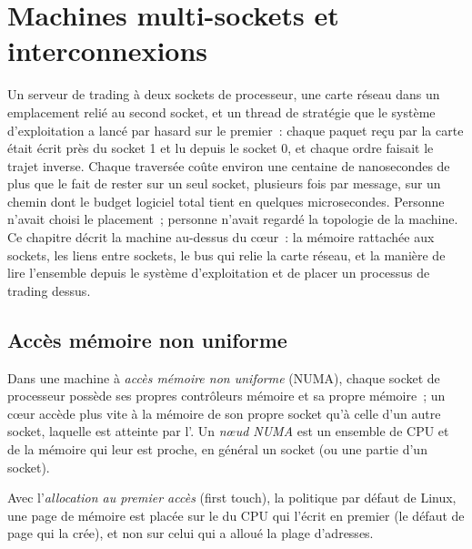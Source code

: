 \chapter{Machines multi-sockets et interconnexions}\label{ch:ll:multi-socket-machines-and-interconnects}

Un serveur de trading à deux sockets de processeur, une carte réseau dans un emplacement relié au second socket, et un thread de stratégie
que le système d'exploitation a lancé par hasard sur le premier~: chaque paquet reçu par la carte était écrit près du socket 1
et lu depuis le socket 0, et chaque ordre faisait le trajet inverse. Chaque traversée coûte environ une centaine
de nanosecondes de plus que le fait de rester sur un seul socket, plusieurs fois par message, sur un chemin dont le budget logiciel total tient en
quelques microsecondes. Personne n'avait choisi le placement~; personne n'avait regardé la topologie de la machine. Ce chapitre décrit
la machine au-dessus du cœur~: la mémoire rattachée aux sockets, les liens entre sockets, le bus qui relie la carte réseau,
et la manière de lire l'ensemble depuis le système d'exploitation et de placer un processus de trading dessus.

\section{Accès mémoire non uniforme}

\begin{definition}\label{def:ll:multi-socket-machines-and-interconnects:numa}
Dans une machine à \emph{accès mémoire non uniforme} (NUMA), chaque socket de processeur possède ses
propres contrôleurs mémoire et sa propre mémoire~; un cœur accède plus vite à la mémoire de son propre socket qu'à celle d'un autre socket, laquelle est atteinte
par l'. Un \emph{nœud NUMA} est un ensemble de CPU et de la mémoire qui leur est proche,
en général un socket (ou une partie d'un socket).
\end{definition}

\begin{definition}\label{def:ll:multi-socket-machines-and-interconnects:first}
Avec l'\emph{allocation au premier accès} (first touch), la politique par défaut de Linux, une page de mémoire est
placée sur le  du CPU qui l'écrit en premier (le défaut de page qui la crée), et non sur celui qui a alloué
la plage d'adresses.
\end{definition}

